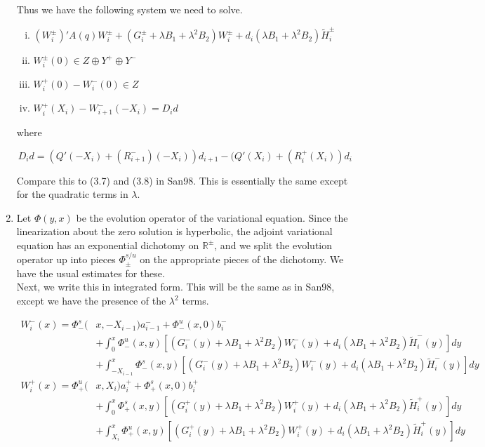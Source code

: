 \documentclass[12pt]{article}
\def\R{{\mathbb R}}
\begin{document}
\begin{enumerate}
Thus we have the following system we need to solve.

\begin{enumerate}[(i)]
\item $(W_i^\pm)' A(q)W_i^\pm + (G_i^\pm + \lambda B_1 + \lambda^2 B_2) W_i^\pm + d_i( \lambda B_1 + \lambda^2 B_2 ) \tilde{H}_i^\pm$
\item $W_i^\pm(0) \in Z \oplus Y^+ \oplus Y^-$
\item $W_i^+(0) - W_i^-(0) \in Z$
\item $W_i^+(X_i) - W_{i+1}^-(-X_i) = D_i d$
\end{enumerate}

where

\begin{equation}
D_i d = (Q'(-X_i) + (R_{i+1}^-)(-X_i))d_{i+1}
- (Q'(X_i) + (R_i^+(X_i))d_i
\end{equation}

Compare this to (3.7) and (3.8) in San98. This is essentially the same except for the quadratic terms in $\lambda$.\\

\item Let $\Phi(y, x)$ be the evolution operator of the variational equation. Since the linearization about the zero solution is hyperbolic, the adjoint variational equation has an exponential dichotomy on $\R^\pm$, and we split the evolution operator up into pieces $\Phi_\pm^{s/u}$ on the appropriate pieces of the dichotomy. We have the usual estimates for these.\\

Next, we write this in integrated form. This will be the same as in San98, except we have the presence of the $\lambda^2$ terms.

\begin{align*}
W_i^-(x) = \Phi_-^s(&x, -X_{i-1})a_{i-1}^- + \Phi_-^u(x, 0)b_i^- \\
&+ \int_0^x \Phi_-^u(x, y)[(G_i^-(y) + \lambda B_1 + \lambda^2 B_2) W_i^-(y) + d_i (\lambda B_1 + \lambda^2 B_2) \tilde{H}_i^-(y) ] dy \\
&+ \int_{-X_{i-1}}^x \Phi_-^s(x, y)[(G_i^-(y) + \lambda B_1 + \lambda^2 B_2) W_i^-(y) + d_i (\lambda B_1 + \lambda^2 B_2) \tilde{H}_i^-(y) ] dy \\
W_i^+(x) = \Phi_+^u(&x, X_i)a_i^+ + \Phi_+^s(x, 0)b_i^+ \\
&+ \int_0^x \Phi_+^s(x, y)[(G_i^+(y) + \lambda B_1 + \lambda^2 B_2) W_i^+(y) + d_i (\lambda B_1 + \lambda^2 B_2) \tilde{H}_i^+(y) ] dy \\
&+ \int_{X_i}^x \Phi_+^u(x, y) [(G_i^+(y) + \lambda B_1 + \lambda^2 B_2) W_i^+(y) + d_i (\lambda B_1 + \lambda^2 B_2) \tilde{H}_i^+(y) ] dy
\end{align*}


\end{enumerate}
\end{document}
